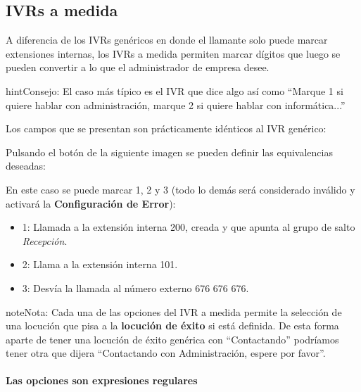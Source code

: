 \documentclass[letterpaper,10pt,spanish]{sphinxmanual}
\begin{document}
\subsection{IVRs a medida}
\label{pbx_features/ivrs:id2}\label{pbx_features/ivrs:custom-ivrs}
A diferencia de los IVRs genéricos en donde el llamante solo puede marcar extensiones internas, los IVRs a medida permiten marcar dígitos que luego se pueden convertir a lo que el administrador de empresa desee.

\begin{notice}{hint}{Consejo:}
El caso más típico es el IVR que dice algo así como ``Marque 1 si quiere hablar con administración, marque 2 si quiere hablar con informática...''
\end{notice}

Los campos que se presentan son prácticamente idénticos al IVR genérico:

Pulsando el botón de la siguiente imagen se pueden definir las equivalencias deseadas:

\noindent{}

En este caso se puede marcar 1, 2 y 3 (todo lo demás será considerado inválido y activará la \textbf{Configuración de Error}):

\noindent{}
\begin{itemize}
\item {} 
1: Llamada a la extensión interna 200, creada {\hyperref[pbx_features/huntgroups:huntgroups]{}} y que apunta al grupo de salto \emph{Recepción}.

\item {} 
2: Llama a la extensión interna 101.

\item {} 
3: Desvía la llamada al número externo 676 676 676.

\end{itemize}

\begin{notice}{note}{Nota:}
Cada una de las opciones del IVR a medida permite la selección de una locución que pisa a la \textbf{locución de éxito} si está definida. De esta forma aparte de tener una locución de éxito genérica con ``Contactando'' podríamos tener otra que dijera ``Contactando con Administración, espere por favor''.
\end{notice}
\paragraph{Las opciones son expresiones regulares}
\end{document}
